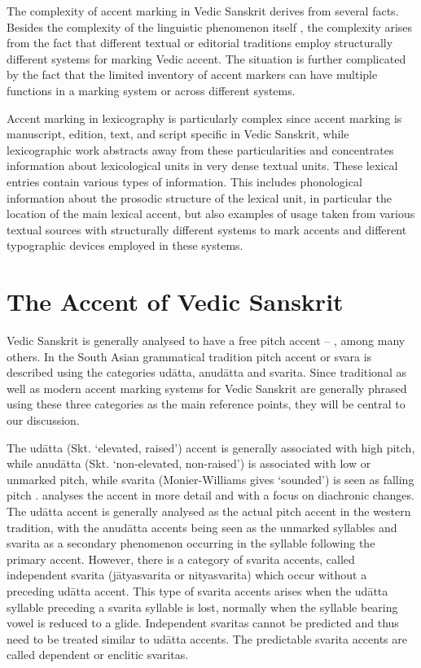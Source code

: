 The complexity of accent marking in Vedic Sanskrit derives from several facts. Besides the complexity of the linguistic phenomenon itself \citep[see][among others]{Kiparsky1973}, the complexity arises from the fact that different textual or editorial traditions employ structurally different systems for marking Vedic accent. The situation is further complicated by the fact that the limited inventory of accent markers can have multiple functions in a marking system or across different systems.

Accent marking in lexicography is particularly complex since accent marking is manu\-script, edition, text, and script specific in Vedic Sanskrit, while lexicographic work abstracts away from these particularities and concentrates information about lexicological units in very dense textual units. These lexical entries contain various types of information. This includes phonological information about the prosodic structure of the lexical unit, in particular the location of the main lexical accent, but also examples of usage taken from various textual sources with structurally different systems to mark accents and different typographic devices employed in these systems.

\section{The Accent of Vedic Sanskrit}

Vedic Sanskrit is generally analysed to have a free pitch accent – \citet{Kiparsky1973}, \citet{Lubotsky1988} among many others. In the South Asian grammatical tradition pitch accent or svara is described using the categories udātta, anudātta and svarita. Since traditional as well as modern accent marking systems for Vedic Sanskrit are generally phrased using these three categories as the main reference points, they will be central to our discussion.

The udātta (Skt. ‘elevated, raised’) accent is generally associated with high pitch, while anudātta (Skt. ‘non-elevated, non-raised’) is associated with low or unmarked pitch, while svarita (Monier-Williams gives ‘sounded’) is seen as falling pitch \citep[p.~27]{Whitney1869}. \citet{Kiparsky1973} analyses the accent in more detail and with a focus on diachronic changes. The udātta accent is generally analysed as the actual pitch accent in the western tradition, with the anudātta accents being seen as the unmarked syllables and svarita as a secondary phenomenon occurring in the syllable following the primary accent. However, there is a category of svarita accents, called independent svarita (jātyasvarita or nityasvarita) which occur without a preceding udātta accent. This type of svarita accents arises when the udātta syllable preceding a svarita syllable is lost, normally when the syllable bearing vowel is reduced to a glide. Independent svaritas cannot be predicted and thus need to be treated similar to udātta accents. The predictable svarita accents are called dependent or enclitic svaritas.

